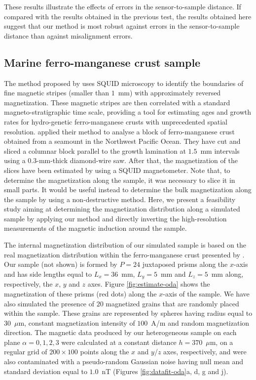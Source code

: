 \documentclass[galley,gc]{agutex}
\begin{document}
\begin{article}
These results illustrate the effects of errors in the sensor-to-sample
distance.
If compared with the results obtained in the previous test, 
the results obtained here suggest that our method is most robust against errors in
the sensor-to-sample distance than against misalignment errors.

\subsection{Marine ferro-manganese crust sample}
\label{subsec:Marine ferro-manganese crust sample}

The method proposed by \citet{oda2011} 
uses SQUID microscopy to identify the boundaries of fine magnetic stripes 
(smaller than $1$~mm) with approximately reversed magnetization. These magnetic stripes are 
then correlated with a standard magneto-stratigraphic time scale, providing a tool for 
estimating ages and growth rates for hydro-genetic ferro-manganese crusts with unprecedented 
spatial resolution.
\citet{oda2011} applied their method to analyse a block of ferro-manganese crust obtained 
from a seamount in the Northwest Pacific Ocean. They have cut and sliced a columnar block 
parallel to the growth lamination at $1.5$~mm intervals using a $0.3$-mm-thick diamond-wire 
saw. After that, the magnetization of the slices have been estimated by using a 
SQUID magnetometer.
Note that, to determine the magnetization along the sample, it was necessary to slice 
it in small parts. It would be useful instead to determine the bulk magnetization along 
the sample by using a non-destructive method.
Here, we present a feasibility study aiming at  
determining the magnetization distribution along a simulated sample
by applying our method and directly inverting the high-resolution measurements of 
the magnetic induction around the sample. 

The internal magnetization distribution of our simulated sample
is based on the real magnetization distribution within the
ferro-manganese crust presented by \citet{oda2011}.
Our sample (not shown) is formed by $P = 24$ juxtaposed prisms along the 
$x$-axis and has side 
lengths equal to $L_{x} = 36$~mm, $L_{y} = 5$~mm and $L_{z} = 5$~mm along, 
respectively, the $x$, $y$ and $z$ axes.
Figure \ref{fig:estimate-oda} shows the magnetization of these prisms 
(red dots) along the $x$-axis of the sample.
We have also simulated the presence of $20$ magnetized grains that 
are randomly placed within the sample.
These grains are represented by spheres having radius equal to $30$~$\mu$m,
constant magnetization intensity of $100$~A/m and random magnetization direction.
The magnetic data produced by our heterogeneous sample on 
each plane $\alpha = 0, 1, 2, 3$ were calculated at a
constant distance $h = 370$~$\mu$m, on
a regular grid of $200 \times 100$ points along the $x$ and 
$y$/$z$ axes, respectively, and were also contaminated with a 
pseudo-random Gaussian noise having null mean and standard 
deviation equal to $1.0$~nT (Figures \ref{fig:datafit-oda}a,
d, g and j).


\end{article}
\end{document}

